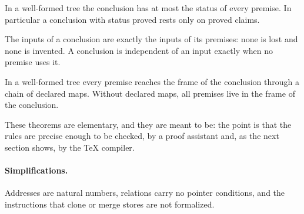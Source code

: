\begin{theorem}
In a well-formed tree the conclusion has at most the status of every premise.  In particular a conclusion with status \textsf{proved}
rests only on proved claims.
\end{theorem}

\begin{theorem}
The inputs of a conclusion are exactly the inputs of its premises: none is lost and none is invented.  A conclusion is independent of an
input exactly when no premise uses it.
\end{theorem}

\begin{theorem}
In a well-formed tree every premise reaches the frame of the conclusion through a chain of declared maps.  Without declared maps, all
premises live in the frame of the conclusion.
\end{theorem}

These theorems are elementary, and they are meant to be: the point is that the rules are precise enough to be checked, by a proof
assistant and, as the next section shows, by the \TeX{} compiler.

\paragraph{Simplifications.}  Addresses are natural numbers, relations carry no pointer conditions, and the instructions that clone or merge
stores are not formalized.
